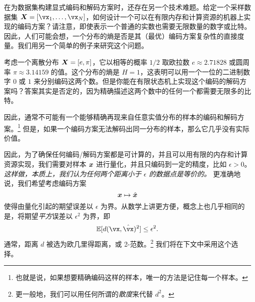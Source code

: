\documentclass[../../book-main_zh.tex]{subfiles}
\begin{document}



在为数据集构建显式编码和解码方案时，还存在另一个技术难题。给定一个采样数据集 $\X = [\vx_1, \ldots, \vx_N]$，如何设计一个可以在有限内存和计算资源的机器上实现的编码方案？请注意，即使表示一个普通的实数也需要无限数量的数字或比特。因此，人们可能会想，一个分布的熵是否是其（最优）编码方案复杂性的直接度量。我们用另一个简单的例子来研究这个问题。
\begin{example}[精度] \label{eg:two-inrational}
	考虑一个离散分布 $\bm{X} = [e, \pi]$，它以相等的概率 $1/2$ 取欧拉数 $e \approx 2.71828$ 或圆周率 $\pi \approx 3.14159$ 的值。这个分布的熵是 $H =1$，这表明可以用一个一位的二进制数字 $0$ 或 $1$ 来分别编码这两个数。但是你能在有限状态机上实现这个编码的解码方案吗？答案其实是否定的，因为精确描述这两个数中的任何一个都需要无限多的比特。
\end{example}

因此，通常不可能有一个能够精确再现来自任意实值分布的样本的编码和解码方案。\footnote{也就是说，如果想要精确编码这样的样本，唯一的方法是记住每一个样本。} 但是，如果一个编码方案无法解码出同一分布的样本，那么它几乎没有实际价值。

因此，为了确保任何编码/解码方案都是可计算的，并且可以用有限的内存和计算资源实现，我们需要对样本 $\bm{x}$ 进行量化，并且只编码到一定的精度，比如 $\epsilon > 0$。{\em 这样做，本质上，我们认为任何两个距离小于 $\epsilon$ 的数据点是等价的。} 更准确地说，我们希望考虑编码方案
\begin{equation}
	\bm{x} \mapsto \hat {\bm{x}}
\end{equation}
使得由量化引起的期望误差以 $\epsilon$ 为界。从数学上讲更方便，概念上也几乎相同的是，将期望\textit{平方}误差以 \(\epsilon^{2}\) 为界，即
\begin{equation}
	\Ex[d(\vx, \hat \vx)^{2}] \le \epsilon^{2}.
\end{equation}
通常，距离 \(d\) 被选为欧几里得距离，或 2-范数。\footnote{更一般地，我们可以用任何所谓的\textit{散度}来代替 \(d^{2}\)。} 我们将在下文中采用这个选择。
\end{document}
